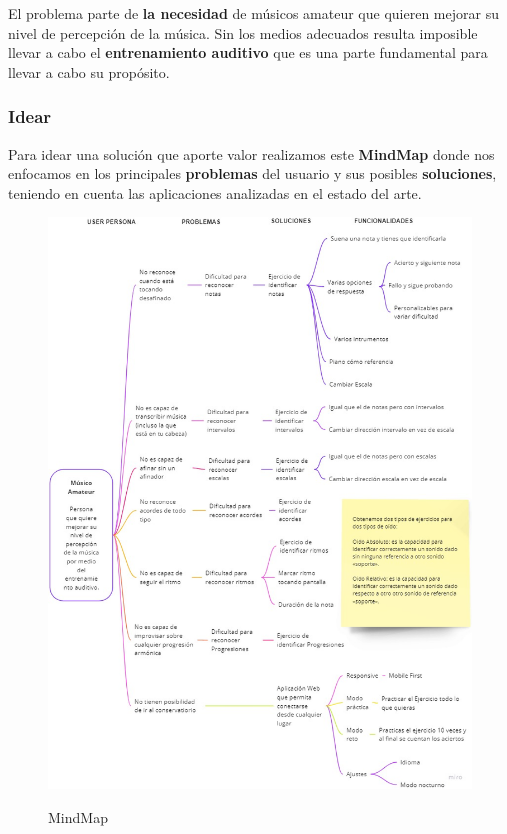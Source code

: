 \documentclass[12pt,twoside,titlepage]{report}
\begin{document}
El problema parte de \textbf{la necesidad} de músicos amateur que quieren mejorar su nivel de percepción de la música. Sin los medios adecuados resulta imposible llevar a cabo el \textbf{entrenamiento auditivo} que es una parte fundamental para llevar a cabo su propósito. 

\subsubsection{Idear}

Para idear una solución que aporte valor realizamos este \textbf{MindMap} donde nos enfocamos en los principales \textbf{problemas} del usuario y sus posibles \textbf{soluciones}, teniendo en cuenta las aplicaciones analizadas en el estado del arte.

\begin{figure}[H]
    \centering
    \includegraphics[scale=0.47]{Design Thinking/MindMap}
    \label{fig:Mindmap}
    \caption{MindMap}
\end{figure}
\end{document}
